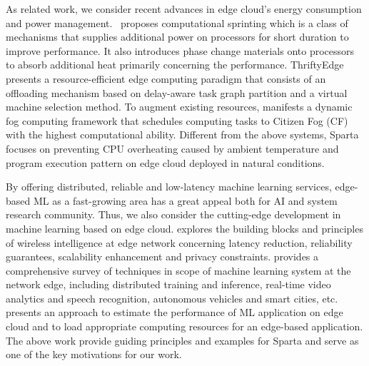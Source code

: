 As related work, we consider recent advances in edge cloud's energy consumption and power management.~\cite{ref:computational_sprint} proposes computational sprinting which is a class of mechanisms that supplies additional power on processors for short duration to improve performance. It also introduces phase change materials onto processors to absorb additional heat primarily concerning the performance. ThriftyEdge~\cite{ref:thrifty_edge} presents a resource-efficient edge computing paradigm that consists of an offloading mechanism based on delay-aware task graph partition and a virtual machine selection method. To augment existing resources, \cite{ref:fog} manifests a dynamic fog computing framework that schedules computing tasks to Citizen Fog (CF) with the highest computational ability. Different from the above systems, Sparta focuses on preventing CPU overheating caused by ambient temperature and program execution pattern on edge cloud deployed in natural conditions. 

By offering distributed, reliable and low-latency machine learning services, edge-based ML as a fast-growing area has a great appeal both for AI and system research community. Thus, we also consider the cutting-edge development in machine learning based on edge cloud. \cite{ref:wireless} explores the building blocks and principles of wireless intelligence at edge network concerning latency reduction, reliability guarantees, scalability enhancement and privacy constraints. \cite{ref:survey} provides a comprehensive survey of techniques in scope of machine learning system at the network edge, including distributed training and inference, real-time video analytics and speech recognition, autonomous vehicles and smart cities, etc. \cite{ref:stargazer} presents an approach to estimate the performance of ML application on edge cloud and to load appropriate computing resources for an edge-based application. The above work provide guiding principles and examples for Sparta and serve as one of the key motivations for our work.